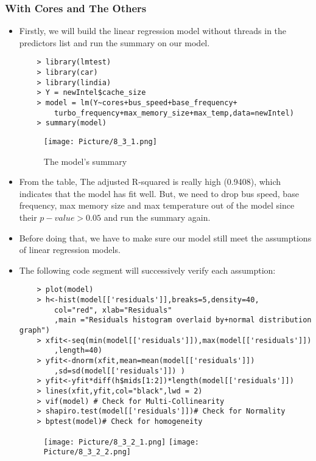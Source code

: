 \documentclass[a4paper]{article}
\begin{document}
\subsubsection{With Cores and The Others}
\begin{itemize}
    \item[] Firstly, we will build the linear regression model without threads in the predictors list and run the summary on our model.
    \begin{lstlisting}
    > library(lmtest)
    > library(car)
    > library(lindia)
    > Y = newIntel$cache_size
    > model = lm(Y~cores+bus_speed+base_frequency+        
        turbo_frequency+max_memory_size+max_temp,data=newIntel)
    > summary(model)
    \end{lstlisting}
    
    \begin{figure}[H]
        \centering
        \texttt{[image: Picture/8\_3\_1.png]}
        \caption{The model's summary}
        \label{8.3.1}
    \end{figure}
    
    \item[] From the table, The adjusted R-squared is really high (0.9408), which indicates that the model has fit well. But, we need to drop bus speed, base frequency, max memory size and max temperature out of the model since their $p-value > 0.05$ and run the summary again.
    
    \item[] Before doing that, we have to make sure our model still meet the assumptions of linear regression models.
    
    \item[] The following code segment will successively verify each assumption:
    \begin{lstlisting}
    > plot(model)
    > h<-hist(model[['residuals']],breaks=5,density=40,
        col="red", xlab="Residuals"
        ,main ="Residuals histogram overlaid by+normal distribution graph")
    > xfit<-seq(min(model[['residuals']]),max(model[['residuals']])
        ,length=40)
    > yfit<-dnorm(xfit,mean=mean(model[['residuals']])
        ,sd=sd(model[['residuals']]) )
    > yfit<-yfit*diff(h$mids[1:2])*length(model[['residuals']])
    > lines(xfit,yfit,col="black",lwd = 2)
    > vif(model) # Check for Multi-Collinearity
    > shapiro.test(model[['residuals']])# Check for Normality
    > bptest(model)# Check for homogeneity
    \end{lstlisting}
    \begin{figure}[H]
        \centering
        \texttt{[image: Picture/8\_3\_2\_1.png]}
        \texttt{[image: Picture/8\_3\_2\_2.png]}
        \label{8.3.2}
    \end{figure}
    

\end{itemize}
\end{document}
